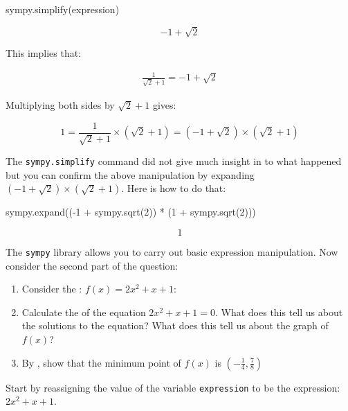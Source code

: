 \begin{pyin}
sympy.simplify(expression)
\end{pyin}

\[ -1 + \sqrt{2}\]

This implies that:

\begin{equation*}
\begin{split}
    \frac{1}{\sqrt{2} + 1} = -1 + \sqrt{2}
\end{split}
\end{equation*}

Multiplying both sides by \({\sqrt{2} + 1}\) gives:

\[
1=\frac{1}{\sqrt{2} + 1}\times \left(\sqrt{2} + 1\right) = \left(-1 + \sqrt{2}\right)\times \left(\sqrt{2} + 1\right)
\]

The \texttt{sympy.simplify} command did not give much insight in to what happened
but you can confirm the above manipulation by expanding \(\left(-1 +
\sqrt{2}\right)\times \left(\sqrt{2} + 1\right)\).
Here is how to do that:

\begin{pyin}
sympy.expand((-1 + sympy.sqrt(2)) * (1 + sympy.sqrt(2)))
\end{pyin}

\[
1
\]

The \texttt{sympy} library allows you to carry out basic expression manipulation.
Now consider the second part of the question:

\begin{enumerate}

\item 

Consider the : \(f(x)=2x ^ 2 + x + 1\):

\item 

Calculate the  of the  equation \(2x ^ 2 + x + 1 =
0\). What does this tell us about the solutions to the equation? What
does this tell us about the graph of \(f(x)\)?

\item 

By , show that the minimum point of \(f(x)\) is
\(\left(-\frac{1}{4}, \frac{7}{8}\right)\)

\end{enumerate}


Start by reassigning the value of the variable \texttt{expression} to be the
expression: \(2x ^ 2 + x + 1\).

